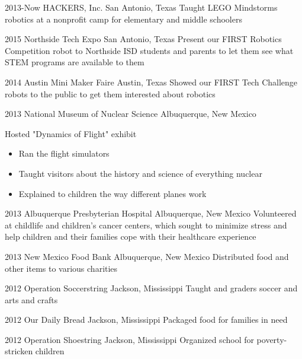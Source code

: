 \documentclass[]{friggeri-cv} %
\begin{document}
\begin{entrylist}


\entry
{2013-Now}
{HACKERS, Inc.}
{San Antonio, Texas}
{Taught LEGO Mindstorms robotics at a nonprofit camp for elementary and middle schoolers}


\entry
{2015}
{Northside Tech Expo}
{San Antonio, Texas}
{Present our FIRST Robotics Competition robot to Northside ISD students and parents to let them see what STEM programs are available to them}


\entry
{2014}
{Austin Mini Maker Faire}
{Austin, Texas}
{Showed our FIRST Tech Challenge robots to the public to get them interested about robotics}


\entry
{2013}
{National Museum of Nuclear Science}
{Albuquerque, New Mexico}
{Hosted "Dynamics of Flight" exhibit 
\begin{itemize}
\item Ran the flight simulators 
\item Taught visitors about the history and science of everything nuclear 
\item Explained to children the way different planes work 
\end{itemize}
}


\entry
{2013}
{Albuquerque Presbyterian Hospital}
{Albuquerque, New Mexico}
{Volunteered at childlife and children's cancer centers, which sought to minimize stress and help children and their families cope with their healthcare experience}

\entry
{2013}
{New Mexico Food Bank}
{Albuquerque, New Mexico}
{Distributed food and other items to various charities}


\entry
{2012}
{Operation Soccerstring}
{Jackson, Mississippi}
{Taught  and  graders soccer and arts and crafts}


\entry
{2012}
{Our Daily Bread}
{Jackson, Mississippi}
{Packaged food for families in need}


\entry
{2012}
{Operation Shoestring}
{Jackson, Mississippi}
{Organized school for poverty-stricken children}


\end{entrylist}
\end{document}
